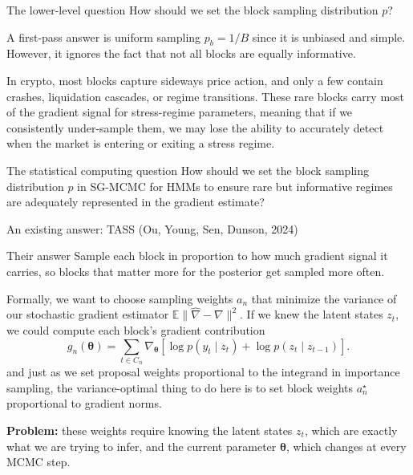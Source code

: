 \documentclass[aspectratio=169]{beamer}
\newcommand{\E}{\mathbb{E}}
\newcommand{\btheta}{\boldsymbol{\theta}}
\begin{document}
\begin{frame}{The lower-level question}
  \Large
  How should we set the block sampling distribution $p$?

  \vspace{0.8em}
  \normalsize
  A first-pass answer is uniform sampling $p_b = 1/B$ since it is unbiased and simple. However, it ignores the fact that not all blocks are equally informative. 
  
  \vspace{0.5em}
  In crypto, most blocks capture sideways price action, and only a few contain crashes, liquidation cascades, or regime transitions. These rare blocks carry most of the gradient signal for stress-regime parameters, meaning that if we consistently under-sample them, we may lose the ability to accurately detect when the market is entering or exiting a stress regime.

  \vspace{0.5em}
  \begin{block}{The statistical computing question}
    How should we set the block sampling distribution $p$ in SG-MCMC for HMMs to ensure rare but informative regimes are adequately represented in the gradient estimate?
  \end{block}
\end{frame}

\begin{frame}{An existing answer: TASS (Ou, Young, Sen, Dunson, 2024)}
  \begin{block}{Their answer}
    Sample each block in proportion to how much gradient signal it carries, so blocks that matter more for the posterior get sampled more often.
  \end{block}

  \vspace{0.3em}
  Formally, we want to choose sampling weights $a_n$ that minimize the variance of our stochastic gradient estimator $\E\|\widehat{\nabla} - \nabla\|^2$. If we knew the latent states $z_t$, we could compute each block's gradient contribution
  \[
    g_n(\btheta) = \sum_{t \in C_n} \nabla_{\btheta} \left[\log p(y_t \mid z_t) + \log p(z_t \mid z_{t-1})\right].
  \]
  and just as we set proposal weights proportional to the integrand in importance sampling, the variance-optimal thing to do here is to set block weights $a_n^\star$ proportional to gradient norms.

  \vspace{0.3em}
  \textbf{Problem:} these weights require knowing the latent states $z_t$, which are exactly what we are trying to infer, and the current parameter $\btheta$, which changes at every MCMC step.
\end{frame}
\end{document}
